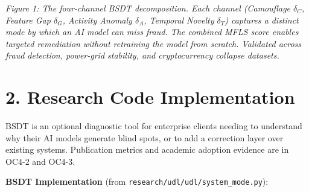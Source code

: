 \documentclass[11pt,a4paper]{article}
\begin{document}
\vspace{0.3cm}
\noindent{}
\vspace{0.2cm}

\noindent\textit{Figure 1: The four-channel BSDT decomposition. Each channel (Camouflage $\delta_C$, Feature Gap $\delta_G$, Activity Anomaly $\delta_A$, Temporal Novelty $\delta_T$) captures a distinct mode by which an AI model can miss fraud. The combined MFLS score enables targeted remediation without retraining the model from scratch. Validated across fraud detection, power-grid stability, and cryptocurrency collapse datasets.}

\section*{2. Research Code Implementation}
BSDT is an optional diagnostic tool for enterprise clients needing to understand why their AI models generate blind spots, or to add a correction layer over existing systems. Publication metrics and academic adoption evidence are in OC4-2 and OC4-3.

\vspace{0.3cm}
\noindent\textbf{BSDT Implementation} (from \texttt{research/udl/udl/system\_mode.py}):
\end{document}
